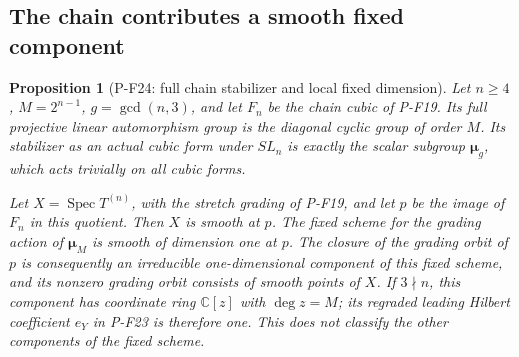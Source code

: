 \documentclass[11pt,a4paper]{article}
\newtheorem{proposition}{Proposition}[section]
\begin{document}
\subsection{The chain contributes a smooth fixed component}

\begin{proposition}[P-F24: full chain stabilizer and local fixed dimension]
\label{prop:chainsmoothcomponent}
Let $n\ge4$, $M=2^{n-1}$, $g=\gcd(n,3)$, and let $F_n$ be the
chain cubic of P-F19. Its full projective linear automorphism group
is the diagonal cyclic group of order $M$. Its stabilizer as an
actual cubic form under $SL_n$ is exactly the scalar subgroup
$\boldsymbol\mu_g$, which acts trivially on all cubic forms.

Let $X=\operatorname{Spec}T^{(n)}$, with the stretch grading of
P-F19, and let $p$ be the image of $F_n$ in this quotient. Then
$X$ is smooth at $p$. The fixed scheme for the grading action of
$\boldsymbol\mu_M$ is smooth of dimension one at $p$.
The closure of the grading orbit of $p$ is consequently an
irreducible one-dimensional component of this fixed scheme,
and its nonzero grading orbit consists of smooth points of $X$.
If $3\nmid n$, this component has coordinate ring
$\mathbb C[z]$ with $\deg z=M$; its regraded leading Hilbert
coefficient $e_Y$ in P-F23 is therefore one.
This does not classify the other components of the fixed scheme.
\end{proposition}
\end{document}
